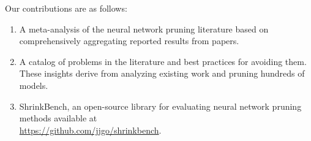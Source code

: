 Our contributions are as follows:%
\begin{enumerate}[leftmargin=5mm]
    \itemsep1pt
    \vspace{-2mm}
    \item A meta-analysis of the neural network pruning literature based on comprehensively aggregating reported results from \npapers papers.
    \item A catalog of problems in the literature and best practices for avoiding them. These insights derive from analyzing existing work and pruning hundreds of models.
    \item ShrinkBench, an open-source library for evaluating neural network pruning methods available at \\{ \url{https://github.com/jjgo/shrinkbench}}.
\end{enumerate}


